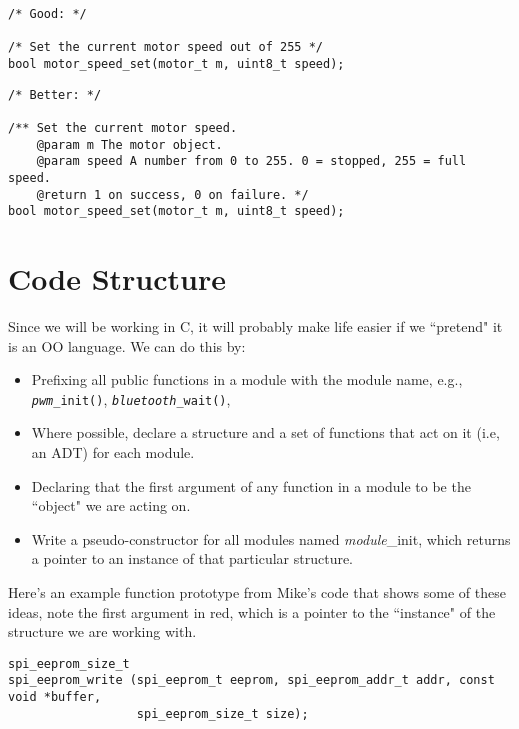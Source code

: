 \documentclass[10pt]{article}
\begin{document}
\begin{lstlisting}[frame=single]
/* Good: */

/* Set the current motor speed out of 255 */
bool motor_speed_set(motor_t m, uint8_t speed);
\end{lstlisting}

\begin{lstlisting}[frame=single]
/* Better: */

/** Set the current motor speed. 
	@param m The motor object.
	@param speed A number from 0 to 255. 0 = stopped, 255 = full speed.
	@return 1 on success, 0 on failure. */
bool motor_speed_set(motor_t m, uint8_t speed);
\end{lstlisting}

\section{Code Structure}
Since we will be working in C, it will probably make life easier if we ``pretend" it is an OO language. We can do this by:
\begin{itemize}
  \item Prefixing all public functions in a module with the module name, e.g., \texttt{\emph{pwm}\_init()}, \texttt{\emph{bluetooth}\_wait()}, 
  \item Where possible, declare a structure and a set of functions that act on it (i.e, an ADT) for each module.
  \item Declaring that the first argument of any function in a module to be the ``object" we are acting on.
  \item Write a pseudo-constructor for all modules named \emph{module}\_init, which returns a pointer to an instance of that particular structure.
\end{itemize}

\noindent Here's an example function prototype from Mike's code that shows some of these ideas, note the first argument in red, which is a pointer to the ``instance" of the structure we are working with.

\begin{lstlisting}[frame=single]
spi_eeprom_size_t
spi_eeprom_write (spi_eeprom_t eeprom, spi_eeprom_addr_t addr, const void *buffer, 
				  spi_eeprom_size_t size);
\end{lstlisting}
\end{document}
